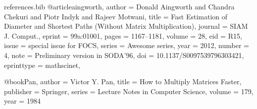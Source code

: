 \begin{filecontents}{references.bib}
@article{aingworth,
author = {Donald Aingworth and Chandra Chekuri and Piotr Indyk and Rajeev Motwani},
title = {Fast Estimation of Diameter and Shortest Paths (Without Matrix Multiplication)},
journal = {SIAM J. Comput.},
eprint = {99a:01001},
pages = {1167--1181},
volume = 28,
eid = {R15},
issue = {special issue for FOCS},
series = {Awesome series},
year = 2012,
number = 4,
note = {Preliminary version in SODA'96},
doi = {10.1137/S0097539796303421},
eprinttype = {mathscinet},
}

@book{Pan,
  author    = {Victor Y. Pan},
  title     = {How to Multiply Matrices Faster},
  publisher = {Springer},
  series    = {Lecture Notes in Computer Science},
  volume    = {179},
  year      = {1984}
}

\end{filecontents}

\documentclass{article}
\providecommand\noopsort[1]{}
\usepackage{xpatch}
\usepackage[%
 backend   =  biber   , 
 style     = trad-plain,
]{biblatex}



\nocite{*}
\printbibliography

